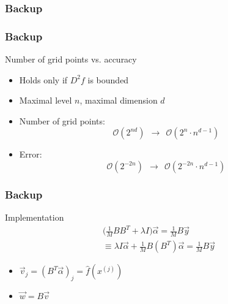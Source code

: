 
\begingroup
\renewcommand{\insertframenumber}{42}
 \begin{frame}
  \frametitle{Backup}
  \topline
  \vspace{-10px}
  \addtocounter{framenumber}{-1}
 \end{frame}
\endgroup

\begingroup
\renewcommand{\insertframenumber}{43}
 \begin{frame}
  \frametitle{Backup}
  \topline
  \vspace{-10px}
  \addtocounter{framenumber}{-1}
  \begin{block}{Number of grid points vs. accuracy}
    \begin{itemize}
    \item Holds only if $D^2f$ is bounded
    \item Maximal level $n$, maximal dimension $d$
      \vspace{10px}
    \item Number of grid points:
      $$\mathcal{O}(2^{nd}) \ \ \rightarrow \ \ \mathcal{O}(2^{n} \cdot n^{d-1})$$
    \item Error:
      $$\mathcal{O}(2^{-2n}) \ \ \rightarrow \ \ \mathcal{O}(2^{-2n} \cdot n^{d-1})$$
    \end{itemize}
  \end{block}
 \end{frame}
\endgroup

\begingroup
\renewcommand{\insertframenumber}{43}
 \begin{frame}
  \frametitle{Backup}
  \topline
  \vspace{-10px}
  \addtocounter{framenumber}{-1}
  \begin{block}{Implementation}
    \begin{equation*}
      \begin{split}
        \Big(\frac{1}{M} BB^T + \lambda I \Big)\vec{\alpha} = \frac{1}{M}B\vec{y} \\
        \equiv \lambda I\vec{\alpha} + \frac{1}{M}B(B^T)\vec{\alpha} = \frac{1}{M}B\vec{y}
      \end{split}
    \end{equation*}
    \begin{itemize}
    \item $\vec{v}_j = (B^T\vec{\alpha})_j = \hat{f}(x^{(j)})$
    \item $\vec{w} = B\vec{v}$
    \end{itemize}
  \end{block}
 \end{frame}
\endgroup


